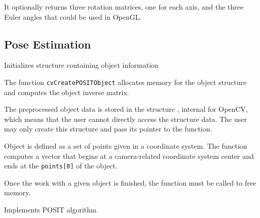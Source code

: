 It optionally returns three rotation matrices, one for each axis, and the three Euler angles that could be used in OpenGL.


\subsection{Pose Estimation}


\label{CreatePOSITObject}

Initializes structure containing object information


\begin{description}
\end{description}

The function \texttt{cvCreatePOSITObject} allocates memory for the object structure and computes the object inverse matrix.

The preprocessed object data is stored in the structure , internal for OpenCV, which means that the user cannot directly access the structure data. The user may only create this structure and pass its pointer to the function.

Object is defined as a set of points given in a coordinate system. The function  computes a vector that begins at a camera-related coordinate system center and ends at the \texttt{points[0]} of the object.

Once the work with a given object is finished, the function  must be called to free memory.

\label{POSIT}

Implements POSIT algorithm


